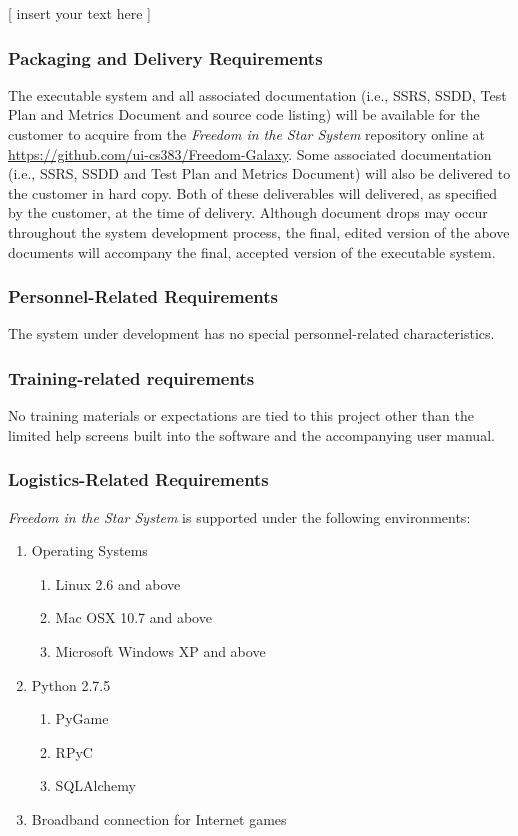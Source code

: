 \documentclass[twoside,letterpaper]{article}
\begin{document}
[ insert your text here ] %

\subsubsection{Packaging and Delivery Requirements}

The executable system and all associated documentation (i.e., SSRS, SSDD, Test Plan and Metrics Document and source code listing) will be available for the customer to acquire from the \textit{Freedom in the Star System} repository online at \url{https://github.com/ui-cs383/Freedom-Galaxy}.  Some associated documentation (i.e., SSRS, SSDD and Test Plan and Metrics Document) will also be delivered to the customer in hard copy.  Both of these deliverables will delivered, as specified by the customer, at the time of delivery.  Although document drops may occur throughout the system development process, the final, edited version of the above documents will accompany the final, accepted version of the executable system.

\subsubsection{Personnel-Related Requirements}
The system under development has no special personnel-related
characteristics.

\subsubsection{Training-related requirements}

No training materials or expectations are tied to this project other
than the limited help screens built into the software and the
accompanying user manual.

\subsubsection{Logistics-Related Requirements}
\textit{Freedom in the Star System} is supported under the following environments:
\begin{enumerate}
	\item Operating Systems
	\begin{enumerate}
		\item Linux 2.6 and above
		\item Mac OSX 10.7 and above
		\item Microsoft Windows XP and above
	\end{enumerate}
	\item Python 2.7.5
	\begin{enumerate}
		\item PyGame
		\item RPyC
		\item SQLAlchemy
	\end{enumerate}
	\item Broadband connection for Internet games
\end{enumerate}
\end{document}
